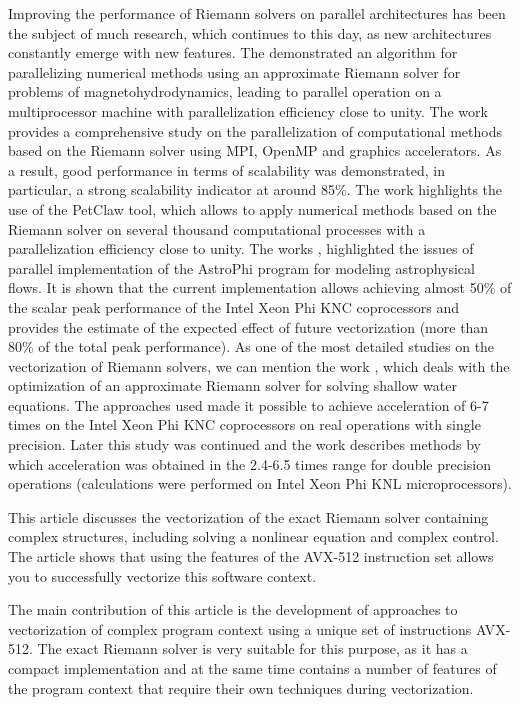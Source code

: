 \documentclass[utf8,english]{psta}%
\begin{document}
Improving the performance of Riemann solvers on parallel architectures has been the subject of much research, which continues to this day, as new architectures constantly emerge with new features.
The \cite{Shumlak} demonstrated an algorithm for parallelizing numerical methods using an approximate Riemann solver for problems of magnetohydrodynamics, leading to parallel operation on a multiprocessor machine with parallelization efficiency close to unity.
The work \cite{Schive} provides a comprehensive study on the parallelization of computational methods based on the Riemann solver using MPI, OpenMP and graphics accelerators.
As a result, good performance in terms of scalability was demonstrated, in particular, a strong scalability indicator at around 85\%.
The \cite{Mandli} work highlights the use of the PetClaw tool, which allows to apply numerical methods based on the Riemann solver on several thousand computational processes with a parallelization efficiency close to unity.
The works \cite{Kulikov}, \cite{Kulikov2} highlighted the issues of parallel implementation of the AstroPhi program for modeling astrophysical flows.
It is shown that the current implementation allows achieving almost 50\% of the scalar peak performance of the Intel Xeon Phi KNC coprocessors and provides the estimate of the expected effect of future vectorization (more than 80\% of the total peak performance).
As one of the most detailed studies on the vectorization of Riemann solvers, we can mention the work \cite{BaderSWEVect}, which deals with the optimization of an approximate Riemann solver for solving shallow water equations.
The approaches used made it possible to achieve acceleration of 6-7 times on the Intel Xeon Phi KNC coprocessors on real operations with single precision.
Later this study was continued and the work \cite{FerreiraSWEVect} describes methods by which acceleration was obtained in the 2.4-6.5 times range for double precision operations (calculations were performed on Intel Xeon Phi KNL microprocessors).

This article discusses the vectorization of the exact Riemann solver containing complex structures, including solving a nonlinear equation and complex control.
The article shows that using the features of the AVX-512 instruction set allows you to successfully vectorize this software context.

The main contribution of this article is the development of approaches to vectorization of complex program context using a unique set of instructions AVX-512.
The exact Riemann solver is very suitable for this purpose, as it has a compact implementation and at the same time contains a number of features of the program context that require their own techniques during vectorization.
\end{document}

